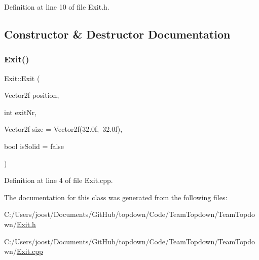 Definition at line 10 of file Exit.\+h.



\subsection{Constructor \& Destructor Documentation}
\mbox{\label{class_exit_ab98655fa93983e9b83175f68c35513de}} 
\subsubsection{\texorpdfstring{Exit()}{Exit()}}
{\footnotesize\ttfamily Exit\+::\+Exit (\begin{DoxyParamCaption}\item[{Vector2f}]{position,  }\item[{int}]{exit\+Nr,  }\item[{Vector2f}]{size = {\ttfamily Vector2f(32.0f,~32.0f)},  }\item[{bool}]{is\+Solid = {\ttfamily false} }\end{DoxyParamCaption})}



Definition at line 4 of file Exit.\+cpp.



The documentation for this class was generated from the following files\+:\begin{DoxyCompactItemize}
\item 
C\+:/\+Users/joost/\+Documents/\+Git\+Hub/topdown/\+Code/\+Team\+Topdown/\+Team\+Topdown/\hyperlink{_exit_8h}{Exit.\+h}\item 
C\+:/\+Users/joost/\+Documents/\+Git\+Hub/topdown/\+Code/\+Team\+Topdown/\+Team\+Topdown/\hyperlink{_exit_8cpp}{Exit.\+cpp}\end{DoxyCompactItemize}

